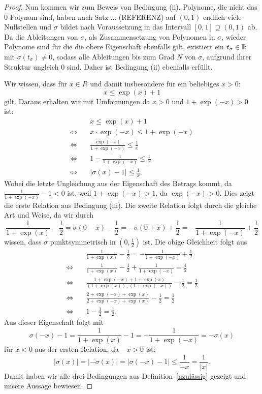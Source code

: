 \begin{proof}
Nun kommen wir zum Beweis von Bedingung (ii). Polynome, die nicht das $0$-Polynom sind, haben nach Satz ... (REFERENZ) auf $(0, 1)$ endlich viele Nullstellen und $\sigma$ bildet nach Voraussetzung in das Intervall $[0, 1] \supseteq (0, 1)$ ab. Da die Ableitungen von $\sigma$, als Zusammensetzung von Polynomen in $\sigma$, wieder Polynome sind für die die obere Eigenschaft ebenfalls gilt, existiert ein $t_{\sigma} \in \mathbb{R}$ mit $\sigma(t_{\sigma}) \neq 0$, sodass alle Ableitungen bis zum Grad $N$ von $\sigma$, aufgrund ihrer Struktur ungleich $0$ sind. Daher ist Bedingung (ii) ebenfalls erfüllt.

Wir wissen, dass für $x \in R$ und damit insbesondere für ein beliebiges $x > 0$: $$ x \leq \exp(x) + 1$$ gilt. Daraus erhalten wir mit Umformungen da $x > 0$ und $1 + \exp(-x) > 0$ ist:
\begin{equation*}
\begin{split}
& \quad x \leq \exp(x) + 1 \\
 \Leftrightarrow & \quad x \cdot \exp(-x) \leq 1 + \exp(-x) \\
 \Leftrightarrow & \quad \frac{\exp(-x)}{1 + \exp(-x)} \leq \frac{1}{x} \\
 \Leftrightarrow & \quad 1 - \frac{1}{1 + \exp(-x)} \leq \frac{1}{x} \\
 \Leftrightarrow & \quad |\sigma(x) - 1| \leq \frac{1}{x}.
\end{split}
\end{equation*}
Wobei die letzte Ungleichung aus der Eigenschaft des Betrags kommt, da $\frac{1}{1 + \exp(-x)} - 1< 0$ ist, weil $1 + \exp(-x) > 1$, da $\exp(-x) > 0$. Dies zeigt die erste Relation aus Bedingung (iii).
Die zweite Relation folgt durch die gleiche Art und Weise, da wir durch $$\frac{1}{1 + \exp(x)} - \frac{1}{2}= \sigma(0 - x) - \frac{1}{2} = -\sigma(0 + x) + \frac{1}{2} = -\frac{1}{1 + \exp(-x)} + \frac{1}{2}$$ 
wissen, dass $\sigma$ punktsymmetrisch in $(0, \frac{1}{2})$ ist. Die obige Gleichheit folgt aus
\begin{equation*}
\begin{split}
 & \quad \frac{1}{1 + \exp(x)} - \frac{1}{2} = -\frac{1}{1 + \exp(-x)} + \frac{1}{2} \\
 \Leftrightarrow  & \quad \frac{1}{1 + \exp(x)} - \frac{1}{2} +\frac{1}{1 + \exp(-x)} = \frac{1}{2}\\
 \Leftrightarrow & \quad  \frac{1 + \exp(-x) + 1 + \exp(x)}{(1 + \exp(x)) \cdot (1 + \exp(-x))} - \frac{1}{2} = \frac{1}{2} \\
 \Leftrightarrow & \quad \frac{2 + \exp(-x) + \exp(x)}{2 + \exp(-x) + \exp(x)} - \frac{1}{2} = \frac{1}{2} \\
 \Leftrightarrow & \quad 1 - \frac{1}{2} = \frac{1}{2}.
\end{split}
\end{equation*}
Aus dieser Eigenschaft folgt mit $$\sigma(- x) - 1 = \frac{1}{1 + \exp(x)} - 1 = -\frac{1}{1 + \exp(-x)} = -\sigma(x)$$ für $x < 0$ aus der ersten Relation, da $-x > 0 $ ist:  
$$|\sigma(x)| = |-\sigma(x)| = |\sigma(- x) - 1| \leq \frac{1}{-x} = \frac{1}{|x|}.$$
Damit haben wir alle drei Bedingungen aus Definition~\ref{nzulässig} gezeigt und unsere Aussage bewiesen.
\end{proof}
